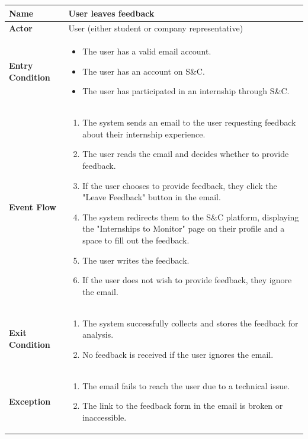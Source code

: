 \begin{longtable}{|p{}|p{}|}
\hline
\textbf{Name} &  User leaves feedback\\
\hline
\textbf{Actor} &  User (either student or company representative)\\
\hline
\textbf{Entry Condition} &  
\begin{itemize}
    \item The user has a valid email account.
    \item  The user has an account on S\&C.
    \item  The user has participated in an internship through S\&C.
\end{itemize}\\
\hline
\textbf{Event Flow} &  
\begin{enumerate}
    \item The system sends an email to the user requesting feedback about their internship experience.
    \item The user reads the email and decides whether to provide feedback.
    \item If the user chooses to provide feedback, they click the "Leave Feedback" button in the email.
    \item The system redirects them to the S\&C platform, displaying the "Internships to Monitor" page on their profile and a space to fill out the feedback.	
    \item The user writes the feedback.
    \item  If the user does not wish to provide feedback, they ignore the email.
\end{enumerate}\\
\hline
\textbf{Exit Condition} & 
\begin{enumerate}
    \item  The system successfully collects and stores the feedback for analysis.
    \item  No feedback is received if the user ignores the email.
\end{enumerate}\\
\hline
\textbf{Exception} &  
\begin{enumerate}
    \item  The email fails to reach the user due to a technical issue.
    \item  The link to the feedback form in the email is broken or inaccessible.
\end{enumerate}\\
\hline
\end{longtable}

